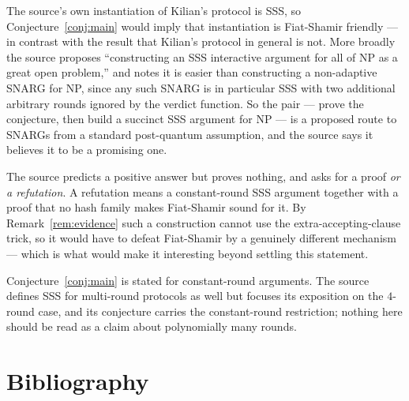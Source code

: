 \documentclass{aicr-conjecture}
\begin{document}
\begin{remark}\label{rem:payoff}
The source's own instantiation of Kilian's protocol is SSS, so
Conjecture~\ref{conj:main} would imply that instantiation is Fiat-Shamir
friendly --- in contrast with the result that Kilian's protocol in general
is not. More broadly the source proposes ``constructing an SSS
interactive argument for all of NP as a great open problem,'' and notes
it is easier than constructing a non-adaptive SNARG for NP, since any
such SNARG is in particular SSS with two additional arbitrary rounds
ignored by the verdict function. So the pair --- prove the conjecture, then
build a succinct SSS argument for NP --- is a proposed route to SNARGs from
a standard post-quantum assumption, and the source says it believes it to
be a promising one.
\end{remark}

\begin{remark}\label{rem:refutation}
The source predicts a positive answer but proves nothing, and asks for a
proof \emph{or a refutation}. A refutation means a constant-round SSS
argument together with a proof that no hash family makes Fiat-Shamir
sound for it. By Remark~\ref{rem:evidence} such a construction cannot use
the extra-accepting-clause trick, so it would have to defeat Fiat-Shamir
by a genuinely different mechanism --- which is what would make it
interesting beyond settling this statement.
\end{remark}

\begin{remark}\label{rem:rounds}
Conjecture~\ref{conj:main} is stated for constant-round arguments. The
source defines SSS for multi-round protocols as well but focuses its
exposition on the $4$-round case, and its conjecture carries the
constant-round restriction; nothing here should be read as a claim about
polynomially many rounds.
\end{remark}

\section{Bibliography}
\end{document}
